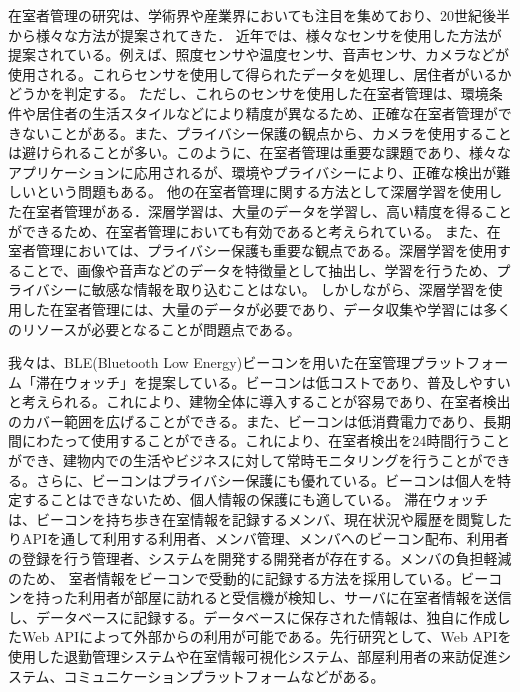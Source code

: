在室者管理の研究は、学術界や産業界においても注目を集めており、20世紀後半から様々な方法が提案されてきた．
近年では、様々なセンサを使用した方法が提案されている。例えば、照度センサや温度センサ、音声センサ、カメラなどが使用される。これらセンサを使用して得られたデータを処理し、居住者がいるかどうかを判定する。
ただし、これらのセンサを使用した在室者管理は、環境条件や居住者の生活スタイルなどにより精度が異なるため、正確な在室者管理ができないことがある。また、プライバシー保護の観点から、カメラを使用することは避けられることが多い。このように、在室者管理は重要な課題であり、様々なアプリケーションに応用されるが、環境やプライバシーにより、正確な検出が難しいという問題もある。
他の在室者管理に関する方法として深層学習を使用した在室者管理がある．深層学習は、大量のデータを学習し、高い精度を得ることができるため、在室者管理においても有効であると考えられている。
また、在室者管理においては、プライバシー保護も重要な観点である。深層学習を使用することで、画像や音声などのデータを特徴量として抽出し、学習を行うため、プライバシーに敏感な情報を取り込むことはない。
しかしながら、深層学習を使用した在室者管理には、大量のデータが必要であり、データ収集や学習には多くのリソースが必要となることが問題点である。

我々は、BLE(Bluetooth Low Energy)ビーコンを用いた在室管理プラットフォーム「滞在ウォッチ」を提案している。ビーコンは低コストであり、普及しやすいと考えられる。これにより、建物全体に導入することが容易であり、在室者検出のカバー範囲を広げることができる。また、ビーコンは低消費電力であり、長期間にわたって使用することができる。これにより、在室者検出を24時間行うことができ、建物内での生活やビジネスに対して常時モニタリングを行うことができる。さらに、ビーコンはプライバシー保護にも優れている。ビーコンは個人を特定することはできないため、個人情報の保護にも適している。
滞在ウォッチは、ビーコンを持ち歩き在室情報を記録するメンバ、現在状況や履歴を閲覧したりAPIを通して利用する利用者、メンバ管理、メンバへのビーコン配布、利用者の登録を行う管理者、システムを開発する開発者が存在する。メンバの負担軽減のため、
室者情報をビーコンで受動的に記録する方法を採用している。ビーコンを持った利用者が部屋に訪れると受信機が検知し、サーバに在室者情報を送信し、データベースに記録する。データベースに保存された情報は、独自に作成したWeb APIによって外部からの利用が可能である。先行研究として、Web APIを使用した退勤管理システムや在室情報可視化システム、部屋利用者の来訪促進システム、コミュニケーションプラットフォームなどがある。


